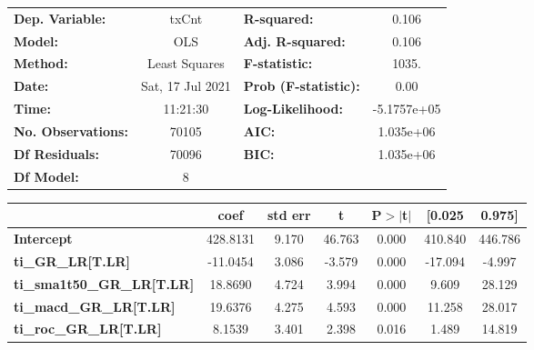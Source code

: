 \begin{center}
\begin{tabular}{lclc}
\toprule
\textbf{Dep. Variable:}                 &      txCnt       & \textbf{  R-squared:         } &      0.106   \\
\textbf{Model:}                         &       OLS        & \textbf{  Adj. R-squared:    } &      0.106   \\
\textbf{Method:}                        &  Least Squares   & \textbf{  F-statistic:       } &      1035.   \\
\textbf{Date:}                          & Sat, 17 Jul 2021 & \textbf{  Prob (F-statistic):} &      0.00    \\
\textbf{Time:}                          &     11:21:30     & \textbf{  Log-Likelihood:    } & -5.1757e+05  \\
\textbf{No. Observations:}              &       70105      & \textbf{  AIC:               } &  1.035e+06   \\
\textbf{Df Residuals:}                  &       70096      & \textbf{  BIC:               } &  1.035e+06   \\
\textbf{Df Model:}                      &           8      & \textbf{                     } &              \\
\bottomrule
\end{tabular}
\begin{tabular}{lcccccc}
                                        & \textbf{coef} & \textbf{std err} & \textbf{t} & \textbf{P$> |$t$|$} & \textbf{[0.025} & \textbf{0.975]}  \\
\midrule
\textbf{Intercept}                      &     428.8131  &        9.170     &    46.763  &         0.000        &      410.840    &      446.786     \\
\textbf{ti\_GR\_LR[T.LR]}               &     -11.0454  &        3.086     &    -3.579  &         0.000        &      -17.094    &       -4.997     \\
\textbf{ti\_sma1t50\_GR\_LR[T.LR]}      &      18.8690  &        4.724     &     3.994  &         0.000        &        9.609    &       28.129     \\
\textbf{ti\_macd\_GR\_LR[T.LR]}         &      19.6376  &        4.275     &     4.593  &         0.000        &       11.258    &       28.017     \\
\textbf{ti\_roc\_GR\_LR[T.LR]}          &       8.1539  &        3.401     &     2.398  &         0.016        &        1.489    &       14.819     \\

\end{tabular}
\end{center}
